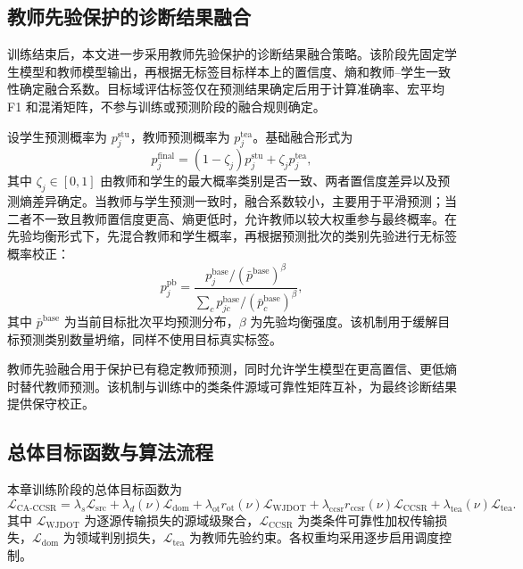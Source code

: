 \documentclass{seuthesis-2022}
\begin{document}
\subsection{教师先验保护的诊断结果融合}

训练结束后，本文进一步采用教师先验保护的诊断结果融合策略。该阶段先固定学生模型和教师模型输出，再根据无标签目标样本上的置信度、熵和教师--学生一致性确定融合系数。目标域评估标签仅在预测结果确定后用于计算准确率、宏平均 F1 和混淆矩阵，不参与训练或预测阶段的融合规则确定。

设学生预测概率为 $p_j^{\mathrm{stu}}$，教师预测概率为 $p_j^{\mathrm{tea}}$。基础融合形式为
\begin{equation}
    p_j^{\mathrm{final}}
    =
    (1-\zeta_j)p_j^{\mathrm{stu}}
    +
    \zeta_j p_j^{\mathrm{tea}},
\end{equation}
其中 $\zeta_j\in[0,1]$ 由教师和学生的最大概率类别是否一致、两者置信度差异以及预测熵差异确定。当教师与学生预测一致时，融合系数较小，主要用于平滑预测；当二者不一致且教师置信度更高、熵更低时，允许教师以较大权重参与最终概率。在先验均衡形式下，先混合教师和学生概率，再根据预测批次的类别先验进行无标签概率校正：
\begin{equation}
    p_j^{\mathrm{pb}}
    =
    \frac{
    p_j^{\mathrm{base}}/(\bar{p}^{\mathrm{base}})^\beta
    }{
    \sum_c
    p_{jc}^{\mathrm{base}}/(\bar{p}_{c}^{\mathrm{base}})^\beta
    },
\end{equation}
其中 $\bar{p}^{\mathrm{base}}$ 为当前目标批次平均预测分布，$\beta$ 为先验均衡强度。该机制用于缓解目标预测类别数量坍缩，同样不使用目标真实标签。

教师先验融合用于保护已有稳定教师预测，同时允许学生模型在更高置信、更低熵时替代教师预测。该机制与训练中的类条件源域可靠性矩阵互补，为最终诊断结果提供保守校正。

\subsection{总体目标函数与算法流程}

本章训练阶段的总体目标函数为
\begin{equation}
    \mathcal{L}_{\mathrm{CA}\text{-}\mathrm{CCSR}}
    =
    \lambda_s\mathcal{L}_{\mathrm{src}}
    +
    \lambda_d(\nu)\mathcal{L}_{\mathrm{dom}}
    +
    \lambda_{\mathrm{ot}} r_{\mathrm{ot}}(\nu)\mathcal{L}_{\mathrm{WJDOT}}
    +
    \lambda_{\mathrm{ccsr}} r_{\mathrm{ccsr}}(\nu)\mathcal{L}_{\mathrm{CCSR}}
    +
    \lambda_{\mathrm{tea}}(\nu)\mathcal{L}_{\mathrm{tea}}.
\end{equation}
其中 $\mathcal{L}_{\mathrm{WJDOT}}$ 为逐源传输损失的源域级聚合，$\mathcal{L}_{\mathrm{CCSR}}$ 为类条件可靠性加权传输损失，$\mathcal{L}_{\mathrm{dom}}$ 为领域判别损失，$\mathcal{L}_{\mathrm{tea}}$ 为教师先验约束。各权重均采用逐步启用调度控制。
\end{document}
